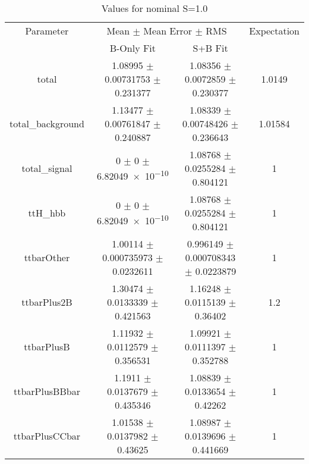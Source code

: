 \begin{table}
\centering
\caption{Values for nominal S=1.0}
\begin{tabular}{cccc}
\toprule
Parameter & \multicolumn{2}{c}{Mean $\pm$ Mean Error $\pm$ RMS} & Expectation\\
 & B-Only Fit & S+B Fit & \\
\midrule
total & \num{1.08995} $\pm$ \num{0.00731753} $\pm$ \num{0.231377} & \num{1.08356} $\pm$ \num{0.0072859} $\pm$ \num{0.230377} & \num{1.0149}\\
total\_background & \num{1.13477} $\pm$ \num{0.00761847} $\pm$ \num{0.240887} & \num{1.08339} $\pm$ \num{0.00748426} $\pm$ \num{0.236643} & \num{1.01584}\\
total\_signal & \num{0} $\pm$ \num{0} $\pm$ \num{6.82049e-10} & \num{1.08768} $\pm$ \num{0.0255284} $\pm$ \num{0.804121} & \num{1}\\
ttH\_hbb & \num{0} $\pm$ \num{0} $\pm$ \num{6.82049e-10} & \num{1.08768} $\pm$ \num{0.0255284} $\pm$ \num{0.804121} & \num{1}\\
ttbarOther & \num{1.00114} $\pm$ \num{0.000735973} $\pm$ \num{0.0232611} & \num{0.996149} $\pm$ \num{0.000708343} $\pm$ \num{0.0223879} & \num{1}\\
ttbarPlus2B & \num{1.30474} $\pm$ \num{0.0133339} $\pm$ \num{0.421563} & \num{1.16248} $\pm$ \num{0.0115139} $\pm$ \num{0.36402} & \num{1.2}\\
ttbarPlusB & \num{1.11932} $\pm$ \num{0.0112579} $\pm$ \num{0.356531} & \num{1.09921} $\pm$ \num{0.0111397} $\pm$ \num{0.352788} & \num{1}\\
ttbarPlusBBbar & \num{1.1911} $\pm$ \num{0.0137679} $\pm$ \num{0.435346} & \num{1.08839} $\pm$ \num{0.0133654} $\pm$ \num{0.42262} & \num{1}\\
ttbarPlusCCbar & \num{1.01538} $\pm$ \num{0.0137982} $\pm$ \num{0.43625} & \num{1.08987} $\pm$ \num{0.0139696} $\pm$ \num{0.441669} & \num{1}\\
\bottomrule
\end{tabular}
\end{table}